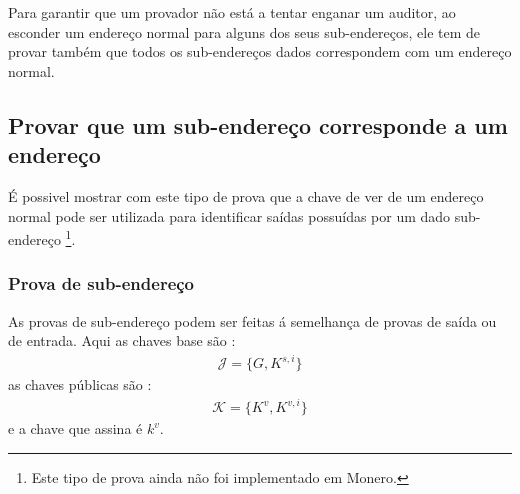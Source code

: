 
Para garantir que um provador não está a tentar enganar um auditor, ao esconder um endereço normal para alguns dos seus sub-endereços, ele tem de provar também que todos os sub-endereços dados correspondem com um endereço normal. 



\subsection{Provar que um sub-endereço corresponde a um endereço}
\label{subsec:proofs-address-subaddress-correspond-subaddressproof}

É possivel mostrar com este tipo de prova que a chave de ver de um endereço normal pode ser utilizada para identificar saídas possuídas por um dado sub-endereço \footnote{Este tipo de prova ainda não foi implementado em Monero.}.

\subsubsection*{Prova de sub-endereço}
As provas de sub-endereço podem ser feitas á semelhança de provas de saída ou de entrada. Aqui as chaves base são :
\begin{align*}
\mathcal{J} = \{G, K^{s,i}\}
\end{align*}
as chaves públicas são :
\begin{align*}
\mathcal{K} = \{K^v, K^{v,i}\}
\end{align*}
e a chave que assina é $k^v$.



